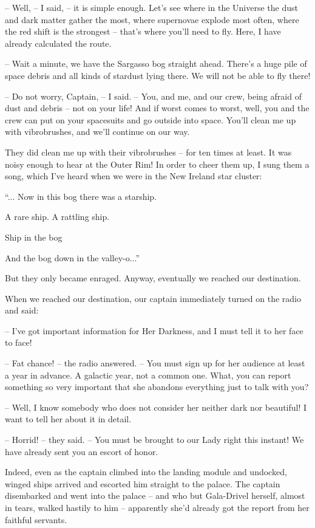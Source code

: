 \documentclass[ebook,oneside,final,openright]{memoir}
\begin{document}
– Well, – I said, – it is simple enough. Let’s see where in the Universe the dust and dark matter gather the most, where supernovae explode most often, where the red shift is the strongest – that’s where you’ll need to fly. Here, I have already calculated the route.\par
– Wait a minute, we have the Sargasso bog straight ahead. There’s a huge pile of space debris and all kinds of stardust lying there. We will not be able to fly there!\par
– Do not worry, Captain, – I said. – You, and me, and our crew, being afraid of dust and debris – not on your life! And if worst comes to worst, well, you and the crew can put on your spacesuits and go outside into space. You’ll clean me up with vibrobrushes, and we’ll continue on our way.\par
\par
They did clean me up with their vibrobrushes – for ten times at least. It was noisy enough to hear at the Outer Rim! In order to cheer them up, I sung them a song, which I’ve heard when we were in the New Ireland star cluster: \par
“... Now in this bog there was a starship.\par
A rare ship. A rattling ship.\par
Ship in the bog\par
And the bog down in the valley-o...”\par
 But they only became enraged. Anyway, eventually we reached our destination.\par
\par
When we reached our destination, our captain immediately turned on the radio and said:\par
– I’ve got important information for Her Darkness, and I must tell it to her face to face!\par
– Fat chance! – the radio answered. – You must sign up for her audience at least a year in advance. A galactic year, not a common one. What, you can report something so very important that she abandons everything just to talk with you?\par
– Well, I know somebody who does not consider her neither dark nor beautiful! I want to tell her about it in detail.\par
– Horrid! – they said. – You must be brought to our Lady right this instant! We have already sent you an escort of honor.\par
\par
Indeed, even as the captain climbed into the landing module and undocked, winged ships arrived and escorted him straight to the palace. The captain disembarked and went into the palace – and who but Gala-Drivel herself, almost in tears, walked hastily to him – apparently she’d already got the report from her faithful servants.\par
\end{document}
